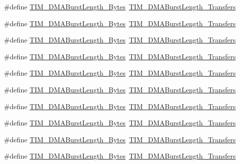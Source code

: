 \begin{DoxyCompactItemize}
\item 
\#define \hyperlink{group___t_i_m___legacy_ga2868d400329e705b89c1e425c9cb4fed}{T\+I\+M\+\_\+\+D\+M\+A\+Burst\+Length\+\_\+Bytes}~\hyperlink{group___t_i_m___d_m_a___burst___length_ga98b208205c133557a9d67a0921559a66}{T\+I\+M\+\_\+\+D\+M\+A\+Burst\+Length\+\_\+Transfers}
\item 
\#define \hyperlink{group___t_i_m___legacy_ga99141ca3210700d07d098d161b42cdf3}{T\+I\+M\+\_\+\+D\+M\+A\+Burst\+Length\+\_\+Bytes}~\hyperlink{group___t_i_m___d_m_a___burst___length_ga2fc09f2148cf6ebddc8e67116212259c}{T\+I\+M\+\_\+\+D\+M\+A\+Burst\+Length\+\_\+Transfers}
\item 
\#define \hyperlink{group___t_i_m___legacy_ga1a4ab1c8a8469f0d28aafb902615f6db}{T\+I\+M\+\_\+\+D\+M\+A\+Burst\+Length\+\_\+Bytes}~\hyperlink{group___t_i_m___d_m_a___burst___length_ga0ca63a3caeaf1e85bd54961891949de7}{T\+I\+M\+\_\+\+D\+M\+A\+Burst\+Length\+\_\+Transfers}
\item 
\#define \hyperlink{group___t_i_m___legacy_ga41a8cee7ca5e9035a04c0920ab0f3f66}{T\+I\+M\+\_\+\+D\+M\+A\+Burst\+Length\+\_\+Bytes}~\hyperlink{group___t_i_m___d_m_a___burst___length_ga9160d52913bbd7ad1e663ff943d01852}{T\+I\+M\+\_\+\+D\+M\+A\+Burst\+Length\+\_\+Transfers}
\item 
\#define \hyperlink{group___t_i_m___legacy_ga79a0397f1c33cc2d0a8b5bdd94eca845}{T\+I\+M\+\_\+\+D\+M\+A\+Burst\+Length\+\_\+Bytes}~\hyperlink{group___t_i_m___d_m_a___burst___length_ga11485e9eee8a6a7edc1df868755eab85}{T\+I\+M\+\_\+\+D\+M\+A\+Burst\+Length\+\_\+Transfers}
\item 
\#define \hyperlink{group___t_i_m___legacy_gae1e210b9c3609e854e05c3594aa01c01}{T\+I\+M\+\_\+\+D\+M\+A\+Burst\+Length\+\_\+Bytes}~\hyperlink{group___t_i_m___d_m_a___burst___length_gab1a097ca7404e518839df99795443fb0}{T\+I\+M\+\_\+\+D\+M\+A\+Burst\+Length\+\_\+Transfers}
\item 
\#define \hyperlink{group___t_i_m___legacy_ga3ca90d9fa3c80590175ba42baac57098}{T\+I\+M\+\_\+\+D\+M\+A\+Burst\+Length\+\_\+Bytes}~\hyperlink{group___t_i_m___d_m_a___burst___length_gad13373f5fd246557a4fc487dc43c37ec}{T\+I\+M\+\_\+\+D\+M\+A\+Burst\+Length\+\_\+Transfers}
\item 
\#define \hyperlink{group___t_i_m___legacy_ga672117a7dafcd778fe8e86db423b07e9}{T\+I\+M\+\_\+\+D\+M\+A\+Burst\+Length\+\_\+Bytes}~\hyperlink{group___t_i_m___d_m_a___burst___length_gafb644e6033f7b46c602b02754b69fde0}{T\+I\+M\+\_\+\+D\+M\+A\+Burst\+Length\+\_\+Transfers}
\item 
\#define \hyperlink{group___t_i_m___legacy_gacffd0dc1f04aa06624a4980dcae6eede}{T\+I\+M\+\_\+\+D\+M\+A\+Burst\+Length\+\_\+Bytes}~\hyperlink{group___t_i_m___d_m_a___burst___length_ga5b2c97f650a3c1726965187d852b8cc5}{T\+I\+M\+\_\+\+D\+M\+A\+Burst\+Length\+\_\+Transfers}
\item 
\#define \hyperlink{group___t_i_m___legacy_ga9c4d457417b1ba72ed0ae9886a75547a}{T\+I\+M\+\_\+\+D\+M\+A\+Burst\+Length\+\_\+Bytes}~\hyperlink{group___t_i_m___d_m_a___burst___length_gaed9f2afef174079f6eb6927abd995b9b}{T\+I\+M\+\_\+\+D\+M\+A\+Burst\+Length\+\_\+Transfers}
\end{DoxyCompactItemize}


